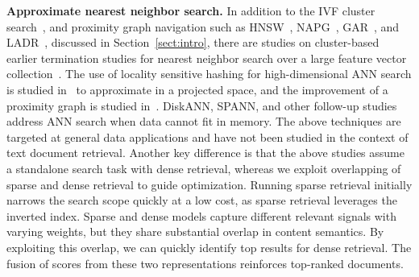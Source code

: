 \textbf{Approximate nearest neighbor search.}
In addition to the IVF cluster 
search~\cite{johnson2019billion}, and proximity graph navigation such as HNSW~\cite{2020TPAMI-HNSW}, NAPG~\cite{2021KDDgraphANN},
GAR~\cite{2022CIKM-MacAvaneyGraphReRank},  and LADR~\cite{2023SIGIR-LADR}, discussed in Section~\ref{sect:intro}, 
there  are studies on  cluster-based earlier termination studies for nearest neighbor search over a large   
feature vector collection~\cite{2020SIGMOD-ANNadaptive,2023USENIX-ANNcluster, 2023VLDB-FARGO}.
The use of locality sensitive hashing  for high-dimensional ANN search 
is studied in~\cite{2020VLDB-ANN-LSH,2023VLDB-FARGO,2015KDD-LSH-ANN} to approximate in
a projected space, and the improvement of a proximity graph is studied in~\cite{2021KDDgraphANN}.
DiskANN, SPANN,  and other follow-up studies~\cite{NEURIPS2019_DiskANN,2023Web-Filtered-DiskANN,2020NIPS-HM-ANN, chen2021spann}
address ANN search when data cannot fit in memory. 
The above techniques are targeted at general data applications and have not been studied in the context of text document retrieval.
Another key difference is that the above studies assume a standalone search task with dense retrieval,
whereas we exploit overlapping of sparse and dense retrieval to guide  optimization.
Running sparse retrieval initially narrows the search scope quickly at a low cost, as 
sparse retrieval leverages the inverted index. Sparse and dense models capture different relevant signals with 
varying weights, but they share substantial overlap in content semantics. By exploiting this overlap, we can quickly identify top results for dense retrieval. The fusion of scores from these two representations reinforces top-ranked documents.


